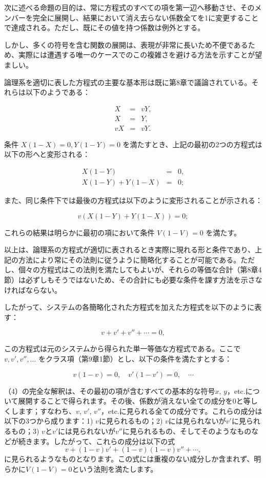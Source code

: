 \documentclass[a4paper,11pt,openany]{ltjsbook}
\begin{document}
次に述べる命題の目的は、常に方程式のすべての項を第一辺へ移動させ、そのメンバーを完全に展開し、結果において消え去らない係数全てを1に変更することで達成される。ただし、既にその値を持つ係数は例外とする。

しかし、多くの符号を含む関数の展開は、表現が非常に長いため不便であるため、実際には遭遇する唯一のケースでのこの複雑さを避ける方法を示すことが望ましい。

論理系を適切に表した方程式の主要な基本形は既に第8章で議論されている。それらは以下のようである：

\begin{eqnarray*}
X &=& vY, \\
X &=& Y, \\
vX &=& vY.
\end{eqnarray*}

条件 $X(1-X) = 0, Y(1-Y) = 0$ を満たすとき、上記の最初の2つの方程式は以下の形へと変形される：

\begin{eqnarray}
X(1-Y) &=& 0, \\
X(1-Y) + Y(1-X) &=& 0;
\end{eqnarray}

また、同じ条件下では最後の方程式は以下のように変形されることが示される：

\begin{equation}
v \left( X(1-Y) + Y(1-X) \right) = 0;
\end{equation}

これらの結果は明らかに最初の項において条件 $V(1-V) = 0$ を満たす。

以上は、論理系の方程式が適切に表されるとき実際に現れる形と条件であり、上記の方法により常にその法則に従うように簡略化することが可能である。ただし、個々の方程式はこの法則を満たしてもよいが、それらの等価な合計（第8章4節）は必ずしもそうではないため、その合計にも必要な条件を課す方法を示さなければならない。

したがって、システムの各簡略化された方程式を加えた方程式を以下のように表す：

\begin{equation}
v + v' + v'' + \cdots = 0,
\end{equation}

この方程式は元のシステムから得られた単一等価な方程式である。ここで $v, v', v'', \ldots$ をクラス項（第9章1節）とし、以下の条件を満たすとする：

\[
v(1-v) = 0, \quad v'(1-v') = 0, \quad \cdots
\]

（4）の完全な解釈は、その最初の項が含むすべての基本的な符号$x$, $y$，etc.について展開することで得られます。その後、係数が消えない全ての成分を0と等しくします；すなわち、$v$, $v'$, $v''$，etc.に見られる全ての成分です。これらの成分は以下の3つから成ります：1) $v$に見られるもの；2) $v$には見られないが$v'$に見られるもの；3) $v$と$v'$には見られないが$v''$に見られるもの、そしてそのようなものなどが続きます。したがって、これらの成分は以下の式
\[
v + (1 - v)v' + (1 - v)(1 - v)v''+ \cdots,
\]
に見られるようなものとなります。この式には重複のない成分しか含まれず、明らかに$V(1-V)=0$という法則を満たします。
\end{document}
